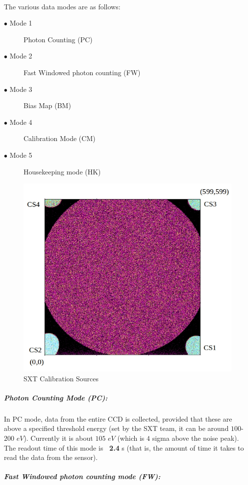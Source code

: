 \documentclass[a4paper,twoside]{report}
\numberwithin{equation}{section}
\begin{document}
\paragraph{}
The various data modes are as follows:
\begin{description}
  \item[$\bullet$ Mode 1] Photon Counting (PC)
  \item[$\bullet$ Mode 2] Fast Windowed photon counting (FW)
  \item[$\bullet$ Mode 3] Bias Map (BM)
  \item[$\bullet$ Mode 4] Calibration Mode (CM)
  \item[$\bullet$ Mode 5] Housekeeping mode (HK)
\end{description}
\begin{figure}
\includegraphics[width=1.0\linewidth]{SXT_calibration.jpg} 
\caption{SXT Calibration Sources}
\label{fig:SXT_Calibration}
\end{figure}
\subparagraph{Photon Counting Mode (PC):}
In PC mode, data from the entire CCD is collected, provided that these are above a specified threshold energy (set by the SXT team, it can be around $100$-$200$ $eV$). Currently it is about $105$ $eV$ (which is $4$ sigma above the noise peak). The readout time of this mode is \textbf{~2.4} s (that is, the amount of time it takes to read the data from the sensor).
\subparagraph{Fast Windowed photon counting mode (FW):}
\end{document}
